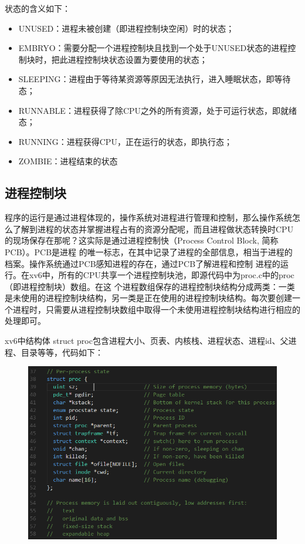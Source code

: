 \documentclass[a4paper,12pt]{report}
\begin{document}
状态的含义如下：
\begin{itemize}
  \item 	UNUSED：进程未被创建（即进程控制块空闲）时的状态；
  \item 	EMBRYO：需要分配一个进程控制块且找到一个处于UNUSED状态的进程控制块时，把此进程控制块状态设置为要使用的状态；
  \item 	SLEEPING：进程由于等待某资源等原因无法执行，进入睡眠状态，即等待态；
  \item 	RUNNABLE：进程获得了除CPU之外的所有资源，处于可运行状态，即就绪态；
  \item 	RUNNING：进程获得CPU，正在运行的状态，即执行态；
  \item 	ZOMBIE：进程结束的状态
\end{itemize}
\subsection{进程控制块}
 程序的运行是通过进程体现的，操作系统对进程进行管理和控制，那么操作系统怎么了解到进程的状态并掌握进程占有的资源分配呢，而且进程做状态转换时CPU的现场保存在那呢？这实际是通过进程控制快（Process Control Block, 简称PCB）。PCB是进程 的唯一标志，在其中记录了进程的全部信息，相当于进程的档案。操作系统通过PCB感知进程的存在，通过PCB了解进程和控制 进程的运行。在xv6中，所有的CPU共享一个进程控制块池，即源代码中为proc.c中的proc（即进程控制块）数组。在这 个进程数组保存的进程控制块结构分成两类：一类是未使用的进程控制块结构，另一类是正在使用的进程控制块结构。每次要创建一个进程时，只需要从进程控制块数组中取得一个未使用进程控制块结构进行相应的处理即可。

xv6中结构体 struct proc包含进程大小、页表、内核栈、进程状态、进程id、父进程、目录等等，代码如下：
\begin{figure}[H]
	\centering
	\includegraphics [width=1.0\textwidth]{figure//image97.png}
\end{figure}
\end{document}
